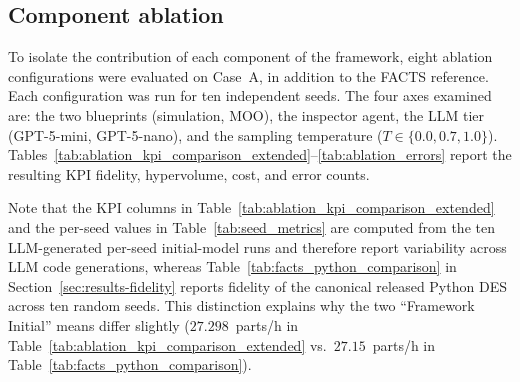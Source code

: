 \documentclass[a4paper,fleqn]{cas-sc}
\begin{document}
\subsection{Component ablation}\label{sec:results-ablation}                                                                               
              
  To isolate the contribution of each component of the framework, eight                                                                     
  ablation configurations were evaluated on Case~A, in addition to the
  FACTS reference. Each configuration was run for ten independent seeds.                                                                    
  The four axes examined are: the two blueprints (simulation, MOO), the                                                                    
  inspector agent, the LLM tier (GPT-5-mini, GPT-5-nano), and the sampling                                                                  
  temperature ($T \in \{0.0, 0.7, 1.0\}$).                                                                                                  
  Tables~\ref{tab:ablation_kpi_comparison_extended}--\ref{tab:ablation_errors}                                                              
  report the resulting KPI fidelity, hypervolume, cost, and error counts.                                                                   
                                                                                                                                            
  Note that the KPI columns in                                                                                                              
  Table~\ref{tab:ablation_kpi_comparison_extended} and the per-seed values                                                                  
  in Table~\ref{tab:seed_metrics} are computed from the ten LLM-generated                                                                   
  per-seed initial-model runs and therefore report variability across LLM                                                                   
  code generations, whereas Table~\ref{tab:facts_python_comparison} in                                                                      
  Section~\ref{sec:results-fidelity} reports fidelity of the canonical                                                                      
  released Python DES across ten random seeds. This distinction explains                                                                    
  why the two ``Framework Initial'' means differ slightly                                                                                   
  ($27.298$~parts/h in Table~\ref{tab:ablation_kpi_comparison_extended}                                                                     
  vs.\ $27.15$~parts/h in Table~\ref{tab:facts_python_comparison}).                                                                         
                                                                                                                                            
\end{document}
